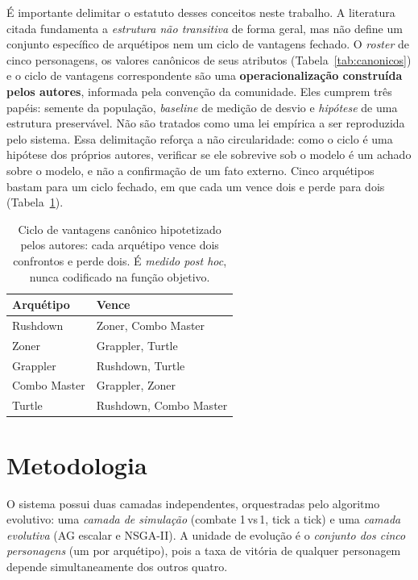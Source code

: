 \documentclass[12pt]{article}
\begin{document}
É importante delimitar o estatuto desses conceitos neste trabalho. A literatura
citada fundamenta a \emph{estrutura não transitiva} de forma geral, mas não define
um conjunto específico de arquétipos nem um ciclo de vantagens fechado. O
\emph{roster} de cinco personagens, os valores canônicos de seus atributos
(Tabela~\ref{tab:canonicos}) e o ciclo de vantagens correspondente são uma
\textbf{operacionalização construída pelos autores}, informada pela convenção da
comunidade. Eles cumprem três papéis: semente da população, \emph{baseline} de
medição de desvio e \emph{hipótese} de uma estrutura preservável. Não são tratados
como uma lei empírica a ser reproduzida pelo sistema. Essa delimitação reforça a
não circularidade: como o ciclo é uma hipótese dos próprios autores, verificar se
ele sobrevive sob o modelo é um achado sobre o modelo, e não a confirmação de um
fato externo. Cinco arquétipos bastam para um ciclo fechado, em que cada um vence
dois e perde para dois (Tabela~\ref{tab:ciclo}).

\begin{table}[ht]
\centering
\caption{Ciclo de vantagens canônico hipotetizado pelos autores: cada arquétipo
vence dois confrontos e perde dois. É \emph{medido post hoc}, nunca codificado na
função objetivo.}
\label{tab:ciclo}
\small
\begin{tabular}{ll}
\toprule
Arquétipo & Vence \\
\midrule
Rushdown     & Zoner, Combo Master \\
Zoner        & Grappler, Turtle \\
Grappler     & Rushdown, Turtle \\
Combo Master & Grappler, Zoner \\
Turtle       & Rushdown, Combo Master \\
\bottomrule
\end{tabular}
\end{table}

\section{Metodologia}

O sistema possui duas camadas independentes, orquestradas pelo algoritmo
evolutivo: uma \emph{camada de simulação} (combate 1\,vs\,1, tick a tick) e uma
\emph{camada evolutiva} (AG escalar e NSGA-II). A unidade de evolução é o
\emph{conjunto dos cinco personagens} (um por arquétipo), pois a taxa de vitória
de qualquer personagem depende simultaneamente dos outros quatro.
\end{document}
